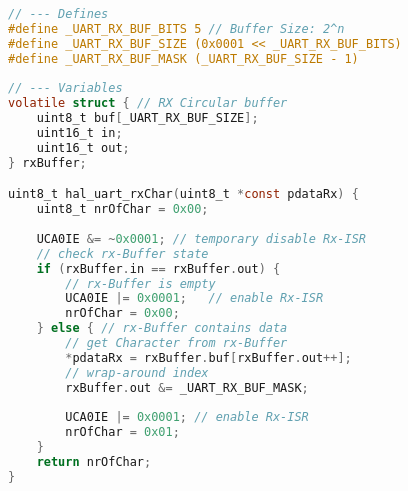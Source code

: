 \begin{lstlisting}[language=C]
// --- Defines
#define _UART_RX_BUF_BITS 5 // Buffer Size: 2^n
#define _UART_RX_BUF_SIZE (0x0001 << _UART_RX_BUF_BITS)
#define _UART_RX_BUF_MASK (_UART_RX_BUF_SIZE - 1)
	
// --- Variables
volatile struct { // RX Circular buffer
	uint8_t buf[_UART_RX_BUF_SIZE];
	uint16_t in;
	uint16_t out;
} rxBuffer;

uint8_t hal_uart_rxChar(uint8_t *const pdataRx) {
	uint8_t nrOfChar = 0x00;
	
	UCA0IE &= ~0x0001; // temporary disable Rx-ISR
	// check rx-Buffer state
	if (rxBuffer.in == rxBuffer.out) {
		// rx-Buffer is empty
		UCA0IE |= 0x0001;	// enable Rx-ISR
		nrOfChar = 0x00;
	} else { // rx-Buffer contains data
		// get Character from rx-Buffer
		*pdataRx = rxBuffer.buf[rxBuffer.out++];
		// wrap-around index
		rxBuffer.out &= _UART_RX_BUF_MASK;
		
		UCA0IE |= 0x0001; // enable Rx-ISR
		nrOfChar = 0x01;
	}
	return nrOfChar;
}
\end{lstlisting}